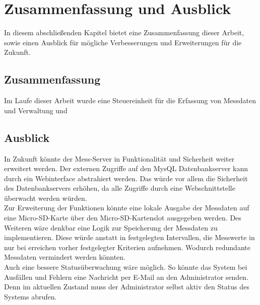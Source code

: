 \chapter{Zusammenfassung und Ausblick}
\label{chapter_FazitUndAusblick}

In diesem abschließenden Kapitel bietet eine Zusammenfassung dieser Arbeit, sowie einen Ausblick für mögliche Verbesserungen und Erweiterungen für die Zukunft.

\section{Zusammenfassung}
Im Laufe dieser Arbeit wurde eine Steuereinheit für die Erfassung von Messdaten und Verwaltung und 
\section{Ausblick}

In Zukunft könnte der Mess-Server in Funktionalität und Sicherheit weiter erweitert werden. Der externen Zugriffe auf den MysQL Datenbankserver kann durch ein Webinterface abstrahiert werden. Das würde vor allem die Sicherheit des Datenbankservers erhöhen, da alle Zugriffe durch eine Webschnittstelle überwacht werden würden.\\
Zur Erweiterung der Funktionen könnte eine lokale Ausgabe der Messdaten auf eine Micro-SD-Karte über den Micro-SD-Kartenslot ausgegeben werden. Des Weiteren wäre denkbar eine Logik zur Speicherung der Messdaten zu implementieren. Diese würde anstatt in festgelegten Intervallen, die Messwerte in nur bei erreichen vorher festgelegter Kriterien aufnehmen. Wodurch redundante Messdaten vermindert werden könnten.\\
Auch eine bessere Statusüberwachung wäre möglich. So könnte das System bei Ausfällen und Fehlern eine Nachricht per E-Mail an den Administrator senden. Denn im aktuellen Zustand muss der Administrator selbst aktiv den Status des Systems abrufen.